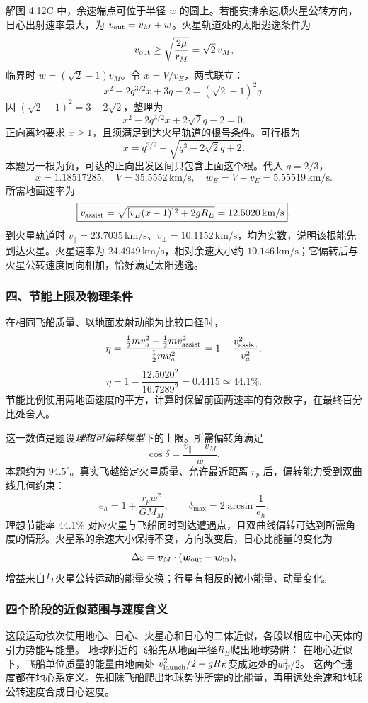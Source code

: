 \documentclass[UTF8,fontset=fandol,a4paper,11pt]{ctexart}
\newcommand{\vect}[1]{\bm{#1}}
\begin{document}
解图 4.12C 中，余速端点可位于半径 $w$ 的圆上。若能安排余速顺火星公转方向，日心出射速率最大，为 $v_{\rm out}=v_M+w$。火星轨道处的太阳逃逸条件为
\[
v_{\rm out}\geq\sqrt{\frac{2\mu}{r_M}}=\sqrt2\,v_M,
\]
临界时 $w=(\sqrt2-1)v_M$。令 $x=V/v_E$，两式联立：
\[
x^2-2q^{3/2}x+3q-2=(\sqrt2-1)^2q.
\]
因 $(\sqrt2-1)^2=3-2\sqrt2$，整理为
\[
x^2-2q^{3/2}x+2\sqrt2q-2=0.
\]
正向离地要求 $x\geq1$，且须满足到达火星轨道的根号条件。可行根为
\[
\boxed{x=q^{3/2}+\sqrt{q^3-2\sqrt2q+2}}.
\]
本题另一根为负，可达的正向出发区间只包含上面这个根。代入 $q=2/3$，
\[
x=1.18517285,\quad V=35.5552\,\mathrm{km/s},\quad
w_E=V-v_E=5.55519\,\mathrm{km/s}.
\]
所需地面速率为
\[
\boxed{v_{\rm assist}=\sqrt{[v_E(x-1)]^2+2gR_E}
=12.5020\,\mathrm{km/s}}.
\]
到火星轨道时 $v_\parallel=23.7035\,\mathrm{km/s}$、$v_\perp=10.1152\,\mathrm{km/s}$，均为实数，说明该根能先到达火星。火星速率为 $24.4949\,\mathrm{km/s}$，相对余速大小约 $10.146\,\mathrm{km/s}$；它偏转后与火星公转速度同向相加，恰好满足太阳逃逸。

\subsubsection*{四、节能上限及物理条件}
在相同飞船质量、以地面发射动能为比较口径时，
\[
\eta=\frac{\frac12mv_a^2-\frac12mv_{\rm assist}^2}{\frac12mv_a^2}
=1-\frac{v_{\rm assist}^2}{v_a^2},
\]
\[
\boxed{\eta=1-\frac{12.5020^2}{16.7289^2}=0.4415\simeq44.1\%}.
\]
节能比例使用两地面速度的平方，计算时保留前面两速率的有效数字，在最终百分比处舍入。

这一数值是题设\emph{理想可偏转模型}下的上限。所需偏转角满足
\[
\cos\delta=\frac{v_\parallel-v_M}{w},
\]
本题约为 $94.5^\circ$。真实飞越给定火星质量、允许最近距离 $r_p$ 后，偏转能力受到双曲线几何约束：
\[
e_h=1+\frac{r_pw^2}{GM_M},\qquad
\delta_{\max}=2\arcsin\frac1{e_h}.
\]
理想节能率 $44.1\%$ 对应火星与飞船同时到达遭遇点，且双曲线偏转可达到所需角度的情形。火星系的余速大小保持不变，方向改变后，日心比能量的变化为
\[
\Delta\varepsilon=\vect v_M\cdot(\vect w_{\rm out}-\vect w_{\rm in}),
\]
增益来自与火星公转运动的能量交换；行星有相反的微小能量、动量变化。
\subsubsection*{四个阶段的近似范围与速度含义}
这段运动依次使用地心、日心、火星心和日心的二体近似，各段以相应中心天体的引力势能写能量。
地球附近的飞船先从地面半径$R_E$爬出地球势阱：
在地心近似下，飞船单位质量的能量由地面处
$v_{\rm launch}^2/2-gR_E$变成远处的$w_E^2/2$。
这两个速度都在地心系定义。先扣除飞船爬出地球势阱所需的比能量，再用远处余速和地球公转速度合成日心速度。
\end{document}
